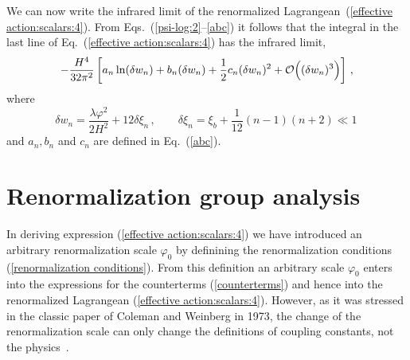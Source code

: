  We can now write the infrared limit of the
 renormalized Lagrangean~(\ref{effective action:scalars:4}).
From Eqs.~(\ref{psi-log:2}--\ref{abc}) it follows that
the integral in the last line of Eq.~(\ref{effective action:scalars:4})
has the infrared limit,
\begin{equation}
 -\frac{H^4}{32\pi^2}\left[
                          a_n\ln(\delta w_n)
                        + b_n(\delta w_n)
                        + \frac12c_n(\delta w_n)^2
                        + {\cal O}\Big((\delta w_n)^3\Big)
                    \right]
\,,
\label{Veff:IR integral}
\end{equation}
where
\begin{equation}
  \delta w_n = \frac{\lambda\varphi^2}{2H^2} + 12 \delta\xi_n
 \,,\qquad \delta\xi_n = \xi_b + \frac{1}{12}(n-1)(n+2)\ll 1
\,
\label{delta w_n}
\end{equation}
and $a_n,b_n$ and $c_n$ are defined in Eq.~(\ref{abc}).

\section{Renormalization group analysis}
\label{Renormalization group analysis}

In deriving expression (\ref{effective action:scalars:4}) we have
introduced an arbitrary renormalization scale $\varphi_0$ by definining
the renormalization conditions (\ref{renormalization
conditions}). From this definition an arbitrary scale
$\varphi_{0}$ enters into the expressions for the counterterms
(\ref{counterterms}) and hence into the renormalized Lagrangean
(\ref{effective action:scalars:4}). However, as it was stressed in
the classic paper of Coleman and Weinberg in 1973, the change of
the renormalization scale can only change the definitions of coupling
constants, not the physics~\cite{ColemanWeinberg:1973}.


